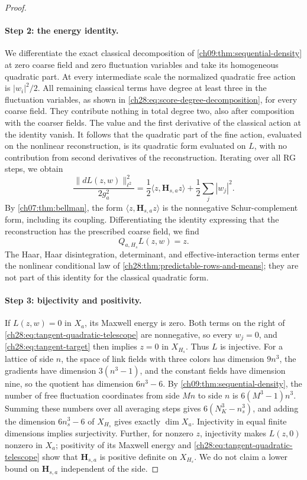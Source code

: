\begin{proof}
\paragraph{Step 2: the energy identity.}
We differentiate the exact classical decomposition of \cref{ch09:thm:sequential-density} at zero coarse field and zero fluctuation variables and take its homogeneous quadratic part. At every intermediate scale the normalized quadratic free action is $|w_i|^2/2$. All remaining classical terms have degree at least three in the fluctuation variables, as shown in \eqref{ch28:eq:score-degree-decomposition}, for every coarse field. They contribute nothing in total degree two, also after composition with the coarser fields. The value and the first derivative of the classical action at the identity vanish. It follows that the quadratic part of the fine action, evaluated on the nonlinear reconstruction, is its quadratic form evaluated on $L$, with no contribution from second derivatives of the reconstruction. Iterating over all RG steps, we obtain
\begin{equation}\label{ch28:eq:tangent-quadratic-telescope}
 \frac{\|dL(z,w)\|_{\ell^2}^2}{2g_a^2}=\frac12\langle z,\mathbf H_{s,a}z\rangle+\frac12\sum_j|w_j|^2.
\end{equation}
By \cref{ch07:thm:bellman}, the form $\langle z,\mathbf H_{s,a}z\rangle$ is the nonnegative Schur-complement form, including its coupling. Differentiating the identity expressing that the reconstruction has the prescribed coarse field, we find
\begin{equation}\label{ch28:eq:tangent-target}
 Q_{a,H_s}L(z,w)=z.
\end{equation}
The Haar, Haar disintegration, determinant, and effective-interaction terms enter the nonlinear conditional law of \cref{ch28:thm:predictable-rows-and-means}; they are not part of this identity for the classical quadratic form.

\paragraph{Step 3: bijectivity and positivity.}
If $L(z,w)=0$ in $X_a$, its Maxwell energy is zero. Both terms on the right of \eqref{ch28:eq:tangent-quadratic-telescope} are nonnegative, so every $w_j=0$, and \eqref{ch28:eq:tangent-target} then implies $z=0$ in $X_{H_s}$. Thus $L$ is injective. For a lattice of side $n$, the space of link fields with three colors has dimension $9n^3$, the gradients have dimension $3(n^3-1)$, and the constant fields have dimension nine, so the quotient has dimension $6n^3-6$. By \cref{ch09:thm:sequential-density}, the number of free fluctuation coordinates from side $Mn$ to side $n$ is $6(M^3-1)n^3$. Summing these numbers over all averaging steps gives $6(N_K^3-n_s^3)$, and adding the dimension $6n_s^3-6$ of $X_{H_s}$ gives exactly $\dim X_a$. Injectivity in equal finite dimensions implies surjectivity. Further, for nonzero $z$, injectivity makes $L(z,0)$ nonzero in $X_a$; positivity of its Maxwell energy and \eqref{ch28:eq:tangent-quadratic-telescope} show that $\mathbf H_{s,a}$ is positive definite on $X_{H_s}$. We do not claim a lower bound on $\mathbf H_{s,a}$ independent of the side.


\end{proof}
